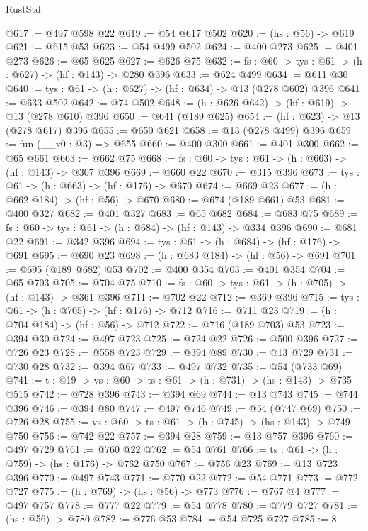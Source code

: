 \begin{lexlean}{RustStd}
\begin{coremodule}
{\begin{coremodule}
{{{{{{{{{{{{@617 := @497 @598 @22
@619 := @54 @617 @502
@620 := (hs : @56) -> @619
@621 := @615 @53
@623 := @54 @499 @502
@624 := @400 @273
@625 := @401 @273
@626 := @65 @625
@627 := @626 @75
@632 := {fs : @60} -> {tys : @61} -> (h : @627) -> (hf : @143) -> @280 @396
@633 := @624 @499
@634 := @611 @30
@640 := {tys : @61} -> (h : @627) -> (hf : @634) -> @13 (@278 @602) @396
@641 := @633 @502
@642 := @74 @502
@648 := (h : @626 @642) -> (hf : @619) -> @13 (@278 @610) @396
@650 := @641 (@189 @625)
@654 := (hf : @623) -> @13 (@278 @617) @396
@655 := @650 @621
@658 := @13 (@278 @499) @396
@659 := fun (__x0 : @3) => @655
@660 := @400 @300
@661 := @401 @300
@662 := @65 @661
@663 := @662 @75
@668 := {fs : @60} -> {tys : @61} -> (h : @663) -> (hf : @143) -> @307 @396
@669 := @660 @22
@670 := @315 @396
@673 := {tys : @61} -> (h : @663) -> (hf : @176) -> @670
@674 := @669 @23
@677 := (h : @662 @184) -> (hf : @56) -> @670
@680 := @674 (@189 @661) @53
@681 := @400 @327
@682 := @401 @327
@683 := @65 @682
@684 := @683 @75
@689 := {fs : @60} -> {tys : @61} -> (h : @684) -> (hf : @143) -> @334 @396
@690 := @681 @22
@691 := @342 @396
@694 := {tys : @61} -> (h : @684) -> (hf : @176) -> @691
@695 := @690 @23
@698 := (h : @683 @184) -> (hf : @56) -> @691
@701 := @695 (@189 @682) @53
@702 := @400 @354
@703 := @401 @354
@704 := @65 @703
@705 := @704 @75
@710 := {fs : @60} -> {tys : @61} -> (h : @705) -> (hf : @143) -> @361 @396
@711 := @702 @22
@712 := @369 @396
@715 := {tys : @61} -> (h : @705) -> (hf : @176) -> @712
@716 := @711 @23
@719 := (h : @704 @184) -> (hf : @56) -> @712
@722 := @716 (@189 @703) @53
@723 := @394 @30
@724 := @497 @723
@725 := @724 @22
@726 := @500 @396
@727 := @726 @23
@728 := @558 @723
@729 := @394 @89
@730 := @13 @729
@731 := @730 @28
@732 := @394 @67
@733 := @497 @732
@735 := @54 (@733 @69)
@741 := {t : @19} -> {vs : @60} -> {ts : @61} -> (h : @731) -> (hs : @143) -> @735 @515
@742 := @728 @396
@743 := @394 @69
@744 := @13 @743
@745 := @744 @396
@746 := @394 @80
@747 := @497 @746
@749 := @54 (@747 @69)
@750 := @726 @28
@755 := {vs : @60} -> {ts : @61} -> (h : @745) -> (hs : @143) -> @749 @750
@756 := @742 @22
@757 := @394 @28
@759 := @13 @757 @396
@760 := @497 @729
@761 := @760 @22
@762 := @54 @761
@766 := {ts : @61} -> (h : @759) -> (hs : @176) -> @762 @750
@767 := @756 @23
@769 := @13 @723 @396
@770 := @497 @743
@771 := @770 @22
@772 := @54 @771
@773 := @772 @727
@775 := (h : @769) -> (hs : @56) -> @773
@776 := @767 @4
@777 := @497 @757
@778 := @777 @22
@779 := @54 @778
@780 := @779 @727
@781 := (hs : @56) -> @780
@782 := @776 @53
@784 := @54 @725 @727
@785 := 8
}}}}}}}}}}}}
\end{coremodule}}
\end{coremodule}
\end{lexlean}
